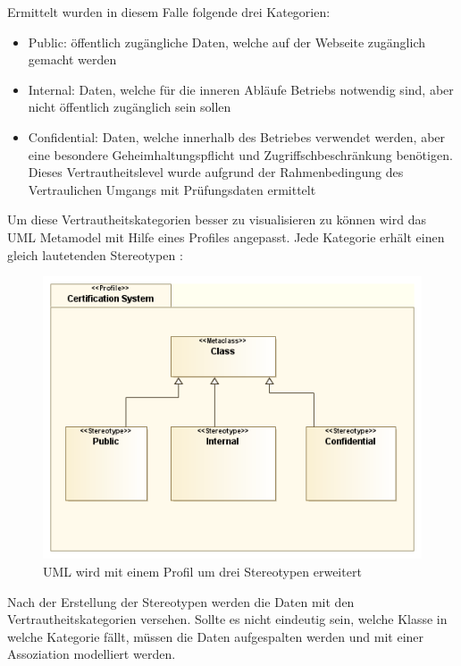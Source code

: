Ermittelt wurden in diesem Falle folgende drei Kategorien:

\begin{itemize}
  \item Public: öffentlich zugängliche Daten, welche auf der Webseite zugänglich gemacht werden
  \item Internal: Daten, welche für die inneren Abläufe Betriebs notwendig sind, aber nicht öffentlich zugänglich sein sollen
  \item Confidential: Daten, welche innerhalb des Betriebes verwendet werden, aber eine besondere Geheimhaltungspflicht und Zugriffschbeschränkung benötigen. Dieses Vertrautheitslevel wurde aufgrund der Rahmenbedingung des Vertraulichen Umgangs mit Prüfungsdaten ermittelt \cite[7.3]{ISO_CERT}
\end{itemize}

Um diese Vertrautheitskategorien besser zu visualisieren zu können wird das UML Metamodel mit Hilfe eines Profiles angepasst. Jede Kategorie erhält einen gleich lautetenden Stereotypen \cite[S. 518]{glasklar}:

\begin{figure}[!htbp]
    \centering
    \includegraphics[scale=0.5]{uml/datastereotypes.png}
    \caption{UML wird mit einem Profil um drei Stereotypen erweitert}
\end{figure}

Nach der Erstellung der Stereotypen werden die Daten mit den Vertrautheitskategorien versehen. Sollte es nicht eindeutig sein, welche Klasse in welche Kategorie fällt, müssen die Daten aufgespalten werden und mit einer Assoziation modelliert werden.

